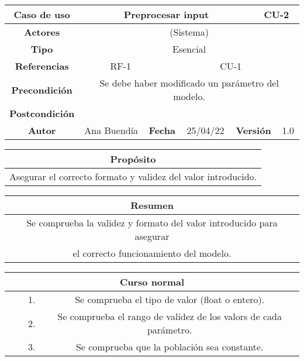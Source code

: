 \begin{table}[!h]
\begin{tabular}{|c|c|c|c|c|c|c|c|}
\hline
\rowcolor{cyan} \textbf{Caso de uso} & \multicolumn{5}{|c|}{Preprocesar input} & \multicolumn{2}{|c|}{CU-2} \\
\hline
\cellcolor{cyan} \textbf{Actores}              & \multicolumn{7}{|c|}{(Sistema)}           \\
\hline
\cellcolor{cyan} \textbf{Tipo}                 & \multicolumn{7}{|c|}{Esencial}             \\
\hline
\cellcolor{cyan} \textbf{Referencias}          & \multicolumn{2}{|c|}{RF-1}           & \multicolumn{5}{|c|}{CU-1}\\
\hline
\cellcolor{cyan} \textbf{Precondición}         & \multicolumn{7}{|c|}{Se debe haber modificado un parámetro del modelo.}             \\
\hline
\cellcolor{cyan} \textbf{Postcondición}        & \multicolumn{7}{|c|}{}              \\
\hline
\cellcolor{cyan} \textbf{Autor}                &   Ana Buendía   & \multicolumn{2}{|c|}{\cellcolor{cyan} \textbf{Fecha}} &  25/04/22   & \multicolumn{2}{|c|}{\cellcolor{cyan} \textbf{Versión}} & 1.0  \\
\hline
\end{tabular}
\end{table}

\begin{table}[!h]
\begin{tabular}{|c|}
\hline
\cellcolor{cyan} \textbf{Propósito} \\
\hline
Asegurar el correcto formato y validez del valor introducido. \\
\hline
\end{tabular}
\end{table}

\begin{table}[!h]
\begin{tabular}{|c|}
\hline
\cellcolor{cyan} \textbf{Resumen}  \\
\hline
 Se comprueba la validez y formato del valor introducido para asegurar \\ el correcto funcionamiento del modelo.  \\
\hline
\end{tabular}
\end{table}

\begin{table}[!h]
\begin{tabular}{|c|c|c|c|}
\hline
\multicolumn{4}{|c|}{\cellcolor{cyan} \textbf{Curso normal}} \\
\hline
              &               &      1.        &    Se comprueba el tipo de valor (float o entero).         \\
\hline
              &               &      2.        &    Se  comprueba el rango de validez de los valors de cada parámetro.         \\
\hline
              &               &      3.        &    Se comprueba que la población sea constante.          \\
\hline
\end{tabular}
\end{table}

